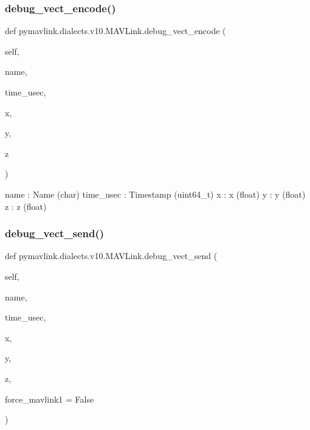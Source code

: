 \begin{DoxyVerb}
\begin{DoxyVerb}
\subsubsection{\texorpdfstring{debug\+\_\+vect\+\_\+encode()}{debug\_vect\_encode()}}
{\footnotesize\ttfamily def pymavlink.\+dialects.\+v10.\+M\+A\+V\+Link.\+debug\+\_\+vect\+\_\+encode (\begin{DoxyParamCaption}\item[{}]{self,  }\item[{}]{name,  }\item[{}]{time\+\_\+usec,  }\item[{}]{x,  }\item[{}]{y,  }\item[{}]{z }\end{DoxyParamCaption})}

\begin{DoxyVerb}name                      : Name (char)
time_usec                 : Timestamp (uint64_t)
x                         : x (float)
y                         : y (float)
z                         : z (float)\end{DoxyVerb}
 \mbox{\label{classpymavlink_1_1dialects_1_1v10_1_1MAVLink_acaab403312d246bfc0b662bd908ef6b2}} 
\subsubsection{\texorpdfstring{debug\+\_\+vect\+\_\+send()}{debug\_vect\_send()}}
{\footnotesize\ttfamily def pymavlink.\+dialects.\+v10.\+M\+A\+V\+Link.\+debug\+\_\+vect\+\_\+send (\begin{DoxyParamCaption}\item[{}]{self,  }\item[{}]{name,  }\item[{}]{time\+\_\+usec,  }\item[{}]{x,  }\item[{}]{y,  }\item[{}]{z,  }\item[{}]{force\+\_\+mavlink1 = {\ttfamily False} }\end{DoxyParamCaption})}


\end{DoxyVerb}
\end{DoxyVerb}
